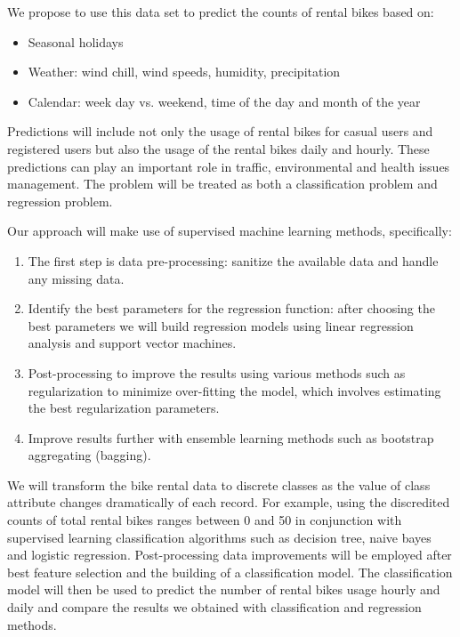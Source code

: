 \documentclass[12pt]{article}
\newcommand{\ci}[1]{\cite{#1}}
\begin{document}
We propose to use this data set to predict the counts of rental bikes based on:

\begin{itemize}
\item Seasonal holidays
\item Weather: wind chill, wind speeds, humidity, precipitation
\item Calendar: week day vs. weekend, time of the day and month of the
      year
\end{itemize}

Predictions will include not only the usage of rental bikes for casual users
and registered users but also the usage of the rental bikes daily and
hourly. These predictions can play an important role in traffic, environmental
and health issues management.  The problem will be treated as both a
classification problem and regression problem.

Our approach will make use of supervised machine learning methods,
specifically:

\begin{enumerate}
\item The first step is data pre-processing: sanitize the available
      data and handle any missing data.

\item Identify the best parameters for the regression function: after choosing
      the best parameters we will build regression models using linear
      regression analysis and support vector machines\ci{svm}.

\item Post-processing to improve the results using various methods such as
      regularization to minimize over-fitting the model, which involves
      estimating the best regularization parameters.

\item Improve results further with ensemble learning methods such as bootstrap
      aggregating (bagging).
\end{enumerate}

We will transform the bike rental data to discrete classes as the value of
class attribute changes dramatically of each record.  For example, using the
discredited counts of total rental bikes ranges between 0 and 50 in conjunction
with supervised learning classification algorithms such as decision tree, naive
bayes and logistic regression\ci{logreg}.  Post-processing data improvements
will be employed after best feature selection and the building of a
classification model.  The classification model will then be used to predict
the number of rental bikes usage hourly and daily and compare the results we
obtained with classification and regression methods.
\end{document}

